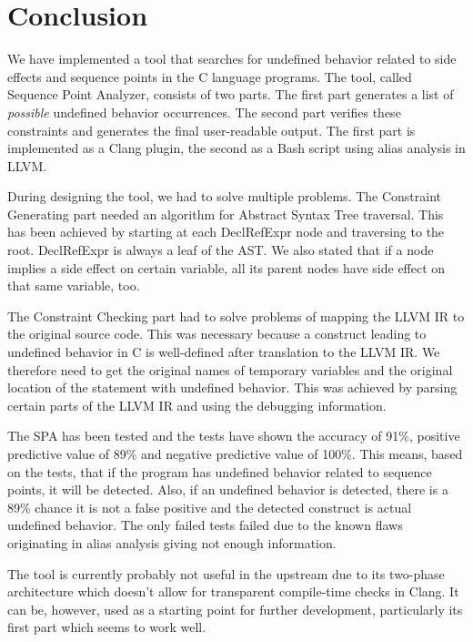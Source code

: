 \chapter{Conclusion}
We have implemented a tool that searches for undefined behavior related to side effects and sequence points in the C language programs. The tool, called Sequence Point Analyzer, consists of two parts. The first part generates a list of \emph{possible} undefined behavior occurrences. The second part verifies these constraints and generates the final user-readable output. The first part is implemented as a Clang plugin, the second as a Bash script using alias analysis in LLVM.

During designing the tool, we had to solve multiple problems. The Constraint Generating part needed an algorithm for Abstract Syntax Tree traversal. This has been achieved by starting at each DeclRefExpr node and traversing to the root. DeclRefExpr is always a leaf of the AST. We also stated that if a node implies a side effect on certain variable, all its parent nodes have side effect on that same variable, too.

The Constraint Checking part had to solve problems of mapping the LLVM IR to the original source code. This was necessary because a construct leading to undefined behavior in C is well-defined after translation to the LLVM IR. We therefore need to get the original names of temporary variables and the original location of the statement with undefined behavior. This was achieved by parsing certain parts of the LLVM IR and using the debugging information.

The SPA has been tested and the tests have shown the accuracy of 91\%, positive predictive value of 89\% and negative predictive value of 100\%. This means, based on the tests, that if the program has undefined behavior related to sequence points, it will be detected. Also, if an undefined behavior is detected, there is a 89\% chance it is not a false positive and the detected construct is actual undefined behavior. The only failed tests failed due to the known flaws  originating in alias analysis giving not enough information.

The tool is currently probably not useful in the upstream due to its two-phase architecture which doesn't allow for transparent compile-time checks in Clang. It can be, however, used as a starting point for further development, particularly its first part which seems to work well.
